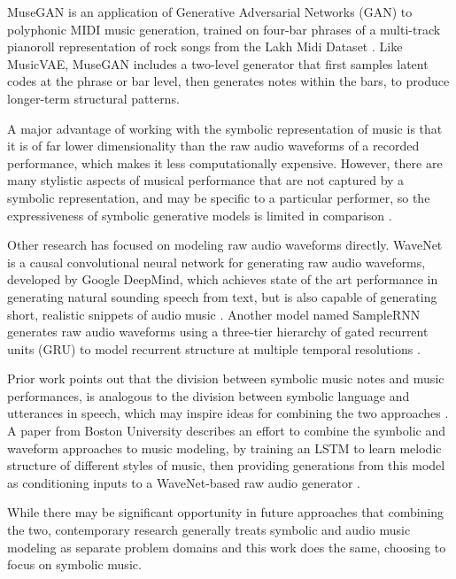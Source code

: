 \documentclass[sigconf,authorversion]{acmart}
\begin{document}
MuseGAN \cite{dong2017musegan} is an application of Generative
Adversarial Networks (GAN) to polyphonic MIDI music generation,
trained on four-bar phrases of a multi-track pianoroll representation
of rock songs from the Lakh Midi Dataset
\cite{raffel_learning-based_2016}. Like MusicVAE, MuseGAN includes a
two-level generator that first samples latent codes at the phrase or
bar level, then generates notes within the bars, to produce
longer-term structural patterns.

A major advantage of working with the symbolic representation of music
is that it is of far lower dimensionality than the raw audio waveforms
of a recorded performance, which makes it less computationally
expensive. However, there are many stylistic aspects of musical
performance that are not captured by a symbolic representation, and
may be specific to a particular performer, so the expressiveness of
symbolic generative models is limited in comparison
\cite{manzelli_conditioning_2018}.

Other research has focused on modeling raw audio waveforms directly. WaveNet is
a causal convolutional neural network for generating raw audio waveforms,
developed by Google DeepMind, which achieves state of the art performance in
generating natural sounding speech from text, but is also capable of generating
short, realistic snippets of audio music \cite{oord_wavenet_2016}.
Another model named SampleRNN generates raw audio waveforms using a three-tier
hierarchy of gated recurrent units (GRU) to model recurrent structure at
multiple temporal resolutions \cite{mehri_samplernn_2017}.

Prior work points out that the division between symbolic music notes
and music performances, is analogous to the division between symbolic
language and utterances in speech, which may inspire ideas for
combining the two approaches \cite{hawthorne2019enabling}. A paper
from Boston University describes an effort to combine the symbolic and
waveform approaches to music modeling, by training an LSTM to learn
melodic structure of different styles of music, then providing
generations from this model as conditioning inputs to a WaveNet-based
raw audio generator \cite{manzelli_conditioning_2018}.

While there may be significant opportunity in future approaches that
combining the two, contemporary research generally treats symbolic and
audio music modeling as separate problem domains and this work does
the same, choosing to focus on symbolic music.
\end{document}
